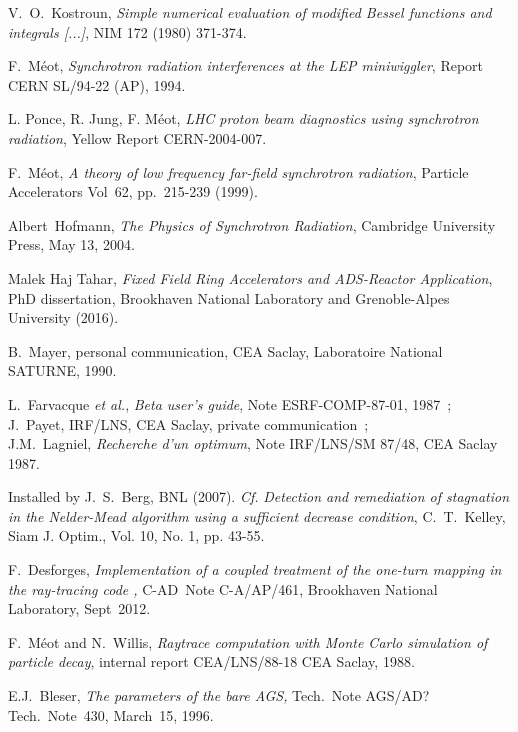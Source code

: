 \begin{thebibliography}{99}
V.~O.~Kostroun, 
\textsl{Simple numerical evaluation of modified Bessel functions and integrals [...]}, 
NIM 172 (1980) 371-374. 

F.~M\'eot, 
\textsl{Synchrotron radiation interferences at the LEP miniwiggler}, 
Report CERN SL/94-22 (AP), 1994. 

L. Ponce,  R. Jung, F. M\'eot, 
\textsl{LHC proton beam diagnostics using synchrotron radiation},  
Yellow Report CERN-2004-007. 

F.~M\'eot, 
\textsl{A theory of low frequency far-field synchrotron radiation}, 
 Particle Accelerators Vol~62, pp.~215-239  (1999). 

Albert~Hofmann, 
\textsl{The Physics of Synchrotron Radiation}, 
Cambridge University Press, May 13, 2004. 

Malek Haj Tahar, 
\textsl{Fixed Field Ring Accelerators and ADS-Reactor Application}, 
PhD dissertation, Brookhaven National Laboratory and Grenoble-Alpes University (2016). 

 B.~Mayer, personal communication,
CEA Saclay, Laboratoire National SATURNE, 1990. 

L.~Farvacque \textsl{et al.}, 
\textsl{Beta user's guide}, 
Note ESRF-COMP-87-01, 1987~; \\
J.~Payet, IRF/LNS, CEA Saclay, private communication~; \\
J.M.~Lagniel, 
\textsl{Recherche d'un optimum}, 
Note IRF/LNS/SM 87/48, CEA Saclay 1987.

Installed by J.~S.~Berg, BNL (2007). 
\emph{Cf.} \textsl{Detection and remediation of stagnation in the 
Nelder-Mead algorithm using a sufficient decrease condition}, 
  C.~T.~Kelley, Siam J. Optim., Vol. 10, No. 1, pp. 43-55. 

F.~Desforges, 
\textsl{Implementation of a coupled treatment of the one-turn mapping in the ray-tracing code \zgoubi, }
C-AD~Note C-A/AP/461, Brookhaven National Laboratory, Sept~2012.



\newpage



F.~M\'eot and N.~Willis, 
\textsl{Raytrace computation with Monte Carlo simulation of particle decay}, 
internal report CEA/LNS/88-18 CEA Saclay, 1988. 

E.J.~Bleser, 
\textsl{The parameters of the bare AGS,}
 Tech.~Note AGS/AD?Tech.~Note~430, March~15, 1996.


\end{thebibliography}
